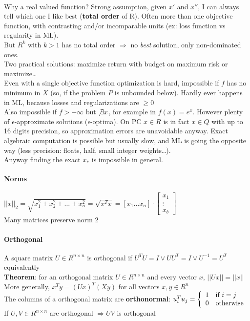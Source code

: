 \documentclass[10pt]{report}
\begin{document}
\paragraph{} Why a real valued function? Strong assumption, given $x'$ and $x''$, I can always tell which one I like best (\textbf{total order} of R). Often more than one objective function, with contrasting and/or incomparable units (ex: loss function vs regularity in ML).\\
But $R^k$ with $k > 1$ has no total order $\Rightarrow$ no \textit{best} solution, only non-dominated ones.\\
Two practical solutions: maximize return with budget on maximum risk or maximize\ldots\\
Even with a single objective function optimization is hard, impossible if $f$ has no minimum in $X$ (so, if the problem $P$ is unbounded below). Hardly ever happens in ML, because losses and regularizations are $\geq 0$\\
Also impossible if $f > -\infty$ but $\not\exists x$, for example in $f(x) = e^x$. However plenty of $\epsilon$-approximate solutions ($\epsilon$-optima). On PC $x\in R$ is in fact $x\in Q$ with up to 16 digits precision, so approximation errors are unavoidable anyway. Exact algebraic computation is possible but usually slow, and ML is going the opposite way (less precision: floats, half, small integer weights\ldots).\\
Anyway finding the exact $x_*$ is impossible in general.
\paragraph{Norms}\begin{list}{}{}
	\item $||x||_2 = \sqrt{x_1^2 + x_2^2 + \ldots + x_n^2} = \sqrt{x^T x} = \left[x_1 \ldots x_n\right]\cdot\left[\begin{array}{c}
	x_1\\\vdots\\x_b
	\end{array}\right]$\\
	Many matrices preserve norm 2
\end{list}
\paragraph{Orthogonal} A square matrix $U\in R^{n\times n}$ is orthogonal if $U^TU = I \vee UU^T = I \vee U^{-1} = U^T$ equivalently\\
\textbf{Theorem}: for an orthogonal matrix $U\in R^{n\times n}$ and every vector $x$, $||Ux|| = ||x||$\\
More generally, $x^T y = (Ux)^T(Xy)$ for all vectors $x,y\in R^n$\\
The columns of a orthogonal matrix are \textbf{orthonormal}: $u_i^Tu_j = \left\{\begin{array}{l l}
1 &\hbox{if } i = j\\0&\hbox{otherwise}
\end{array}\right.$\\
If $U,V\in R^{n\times n}$ are orthogonal $\Rightarrow UV$ is orthogonal
\end{document}
